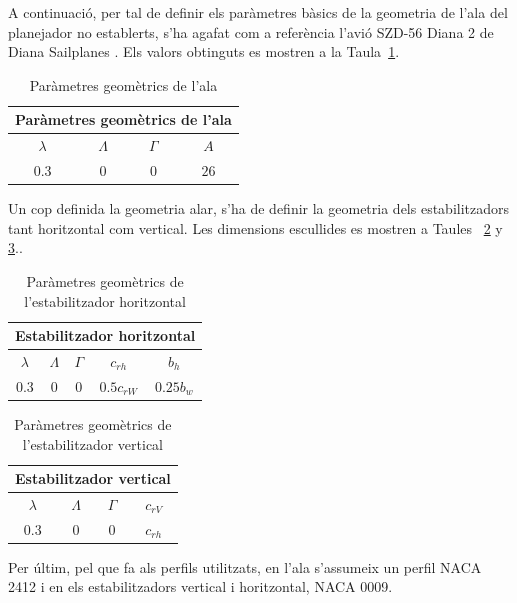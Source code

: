 A continuació, per tal de definir els paràmetres bàsics de la geometria de l'ala del planejador no establerts, s'ha agafat com a referència l'avió SZD-56 Diana 2 de Diana Sailplanes \cite{Kubrynski2006}. Els valors obtinguts es mostren a la Taula~\ref{tab:WingGeom}.

\begin{table} [h]
	\centering
	\begin{tabular}{| c | c | c | c |}	
		\hline
		\multicolumn{4}{|c|}{\bfseries Paràmetres geomètrics de l'ala} \\
		\hline\hline
	\textbf{$\lambda$} & \textbf{$\Lambda$} & \textbf{$\Gamma$} & \textbf{$A$}\\ \hline 
		$0.3$ & $0$ & $0$ & $26$\\
		\hline	
	\end{tabular}
\caption{Paràmetres geomètrics de l'ala} \label{tab:WingGeom}
\end{table}

Un cop definida la geometria alar, s'ha de definir la geometria dels estabilitzadors tant horitzontal com vertical. Les dimensions escullides es mostren a Taules~ \ref{tab:HSGeom} y \ref{tab:VSGeom}..

\begin{table} [h]
	\centering
	\begin{tabular}{| c | c | c | c | c |}	
		\hline
		\multicolumn{5}{|c|}{\bfseries Estabilitzador horitzontal} \\
		\hline\hline
	\textbf{$\lambda$} & \textbf{$\Lambda$} & \textbf{$\Gamma$} & \textbf{$c_{rh}$} & \textbf{$b_{h}$} \\ \hline
		$0.3$ & $0$ & $0$ & $0.5c_{rW}$ & $0.25b_{w}$\\
		\hline	
	\end{tabular}
\caption{Paràmetres geomètrics de l'estabilitzador horitzontal} \label{tab:HSGeom}
\end{table}

\begin{table} [h]
	\centering
	\begin{tabular}{| c | c | c | c |}	
		\hline
		\multicolumn{4}{|c|}{\bfseries Estabilitzador vertical} \\
		\hline\hline
	\textbf{$\lambda$} & \textbf{$\Lambda$} & \textbf{$\Gamma$} & \textbf{$c_{rV}$}  \\ \hline
		$0.3$ & $0$ & $0$ & $c_{rh}$ \\
		\hline	
	\end{tabular}
\caption{Paràmetres geomètrics de l'estabilitzador vertical} \label{tab:VSGeom}
\end{table}

Per últim, pel que fa als perfils utilitzats, en l'ala s'assumeix un perfil NACA 2412 i en els estabilitzadors vertical i horitzontal, NACA 0009.